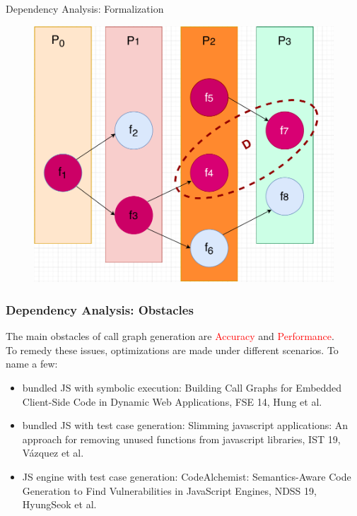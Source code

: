 \documentclass{beamer}
\begin{document}
\begin{frame}{Dependency Analysis: Formalization}
\begin{figure}
    \centering
    \includegraphics[height=0.8\textheight]{formalization.pdf}
\end{figure}
\end{frame}

\begin{frame}
\frametitle{Dependency Analysis: Obstacles}
The main obstacles of call graph generation are \textcolor{red}{Accuracy} and \textcolor{red}{Performance}. \\
To remedy these issues, optimizations are made under different scenarios. To name a few:
\begin{itemize}
    \item bundled JS with symbolic execution: Building Call Graphs for Embedded Client-Side Code in Dynamic Web Applications, FSE 14, Hung et al.
    \item bundled JS with test case generation: Slimming javascript applications: An approach for removing unused functions from javascript libraries, IST 19, Vázquez et al. 
    \item JS engine with test case generation: CodeAlchemist: Semantics-Aware Code Generation to Find Vulnerabilities in JavaScript Engines, NDSS 19, HyungSeok et al.
\end{itemize}
\end{frame}
\end{document}

